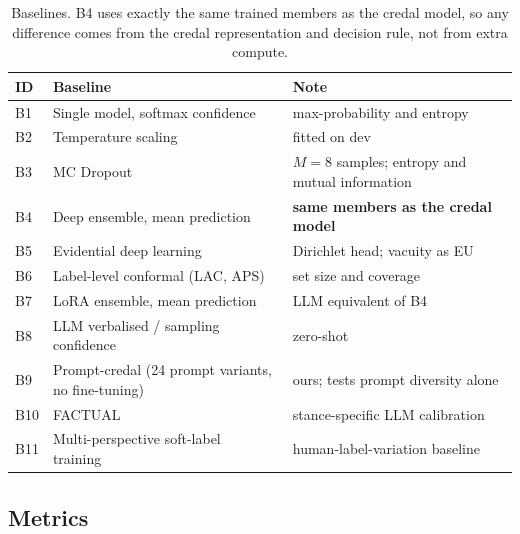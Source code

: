 \documentclass[11pt,a4paper]{article}
\begin{document}
\begin{table}[ht]
\centering
\small
\begin{tabular}{l p{6.2cm} p{5.6cm}}
\toprule
ID & Baseline & Note \\
\midrule
B1 & Single model, softmax confidence & max-probability and entropy \\
B2 & Temperature scaling~\cite{guo2017} & fitted on dev \\
B3 & MC Dropout~\cite{gal2016} & $M=8$ samples; entropy and mutual information \\
B4 & Deep ensemble, mean prediction~\cite{lakshminarayanan2017} & \textbf{same members as the credal model} \\
B5 & Evidential deep learning~\cite{sensoy2018} & Dirichlet head; vacuity as EU \\
B6 & Label-level conformal (LAC, APS)~\cite{angelopoulos2023,romano2020} & set size and coverage \\
B7 & LoRA ensemble, mean prediction~\cite{wang2023lora} & LLM equivalent of B4 \\
B8 & LLM verbalised / sampling confidence~\cite{xiong2024} & zero-shot \\
B9 & Prompt-credal (24 prompt variants, no fine-tuning) & ours; tests prompt diversity alone \\
B10 & FACTUAL~\cite{factual2024} & stance-specific LLM calibration \\
B11 & Multi-perspective soft-label training~\cite{muscato2024} & human-label-variation baseline \\
\bottomrule
\end{tabular}
\caption{Baselines. B4 uses exactly the same trained members as the credal model, so any
difference comes from the credal representation and decision rule, not from extra compute.}
\label{tab:baselines}
\end{table}

\subsection{Metrics}
\end{document}
